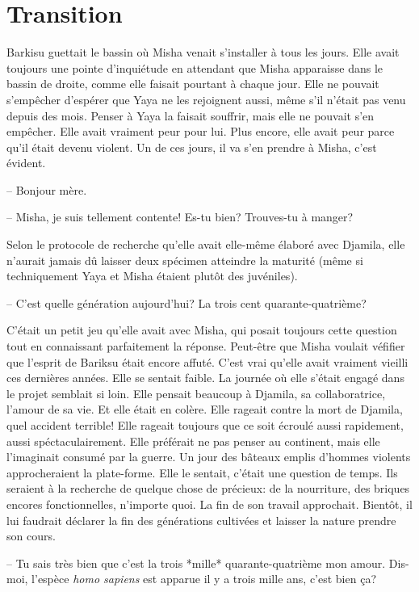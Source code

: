 \chapter{Transition}

Barkisu guettait le bassin où Misha venait s'installer à tous les jours.
%
Elle avait toujours une pointe d'inquiétude en attendant que Misha apparaisse
dans le bassin de droite, comme elle faisait pourtant à chaque jour.  
%
Elle ne pouvait s'empêcher d'espérer que Yaya ne les rejoignent aussi, même
s'il n'était pas venu depuis des mois.
% 
Penser à Yaya la faisait souffrir, mais elle ne pouvait s'en empêcher.
%
Elle avait vraiment peur pour lui. 
%
Plus encore, elle avait peur parce qu'il était devenu violent. 
%
Un de ces jours, il va s'en prendre à Misha, c'est évident.

-- Bonjour mère.

-- Misha, je suis tellement contente! Es-tu bien? Trouves-tu à manger?

Selon le protocole de recherche qu'elle avait elle-même élaboré avec Djamila,
elle n'aurait jamais dû laisser deux spécimen atteindre la maturité (même si techniquement Yaya et Misha étaient plutôt des juvéniles).
%

-- C'est quelle génération aujourd'hui? La trois cent quarante-quatrième?

C'était un petit jeu qu'elle avait avec Misha, qui posait toujours cette
question tout en connaissant parfaitement la réponse.
%
Peut-être que Misha voulait véfifier que l'esprit de Bariksu était encore affuté.
%
C'est vrai qu'elle avait vraiment vieilli ces dernières années. 
%
%
Elle se sentait faible.
%
La journée où elle s'était engagé dans le projet \nomProjet{} semblait si loin.
% 
Elle pensait beaucoup à Djamila, sa collaboratrice, l'amour de sa vie.
%
Et elle était en colère.
%
Elle rageait contre la mort de Djamila, quel accident terrible!
%
Elle rageait toujours que \nomProjet{} ce soit écroulé aussi rapidement, aussi
spéctaculairement.
%
Elle préférait ne pas penser au continent, mais elle l'imaginait consumé par la
guerre.
%
Un jour des bâteaux emplis d'hommes violents approcheraient la plate-forme.
Elle le sentait, c'était une question de temps. 
Ils seraient à la recherche de quelque chose de précieux: de la nourriture, des briques encores fonctionnelles, n'importe
quoi.
%
La fin de son travail approchait. 
%
Bientôt, il lui faudrait déclarer la fin des générations cultivées et laisser la nature prendre son cours.
%

-- Tu sais très bien que c'est la trois *mille* quarante-quatrième mon amour. Dis-moi, l'espèce \textit{homo sapiens} est apparue il y a trois mille ans, c'est bien ça?

